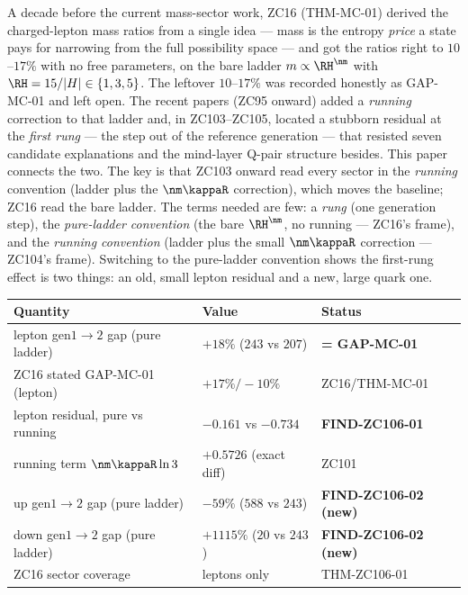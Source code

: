 \documentclass[12pt, a4paper]{article}
\begin{document}
A decade before the current mass-sector work, ZC16 (THM-MC-01) derived the
charged-lepton mass ratios from a single idea --- mass is the entropy
\emph{price} a state pays for narrowing from the full possibility space --- and
got the ratios right to $10$--$17\%$ with no free parameters, on the bare ladder
$m\propto\RH^{\nm}$ with $\RH=15/|H|\in\{1,3,5\}$. The leftover $10$--$17\%$ was
recorded honestly as GAP-MC-01 and left open. The recent papers (ZC95 onward)
added a \emph{running} correction to that ladder and, in ZC103--ZC105, located a
stubborn residual at the \emph{first rung} --- the step out of the reference
generation --- that resisted seven candidate explanations and the mind-layer
Q-pair structure besides. This paper connects the two. The key is that ZC103
onward read every sector in the \emph{running} convention (ladder plus the
$\nm\kappaR$ correction), which moves the baseline; ZC16 read the bare ladder. The
terms needed are few: a \emph{rung} (one generation step), the \emph{pure-ladder
convention} (the bare $\RH^{\nm}$, no running --- ZC16's frame), and the
\emph{running convention} (ladder plus the small $\nm\kappaR$ correction ---
ZC104's frame). Switching to the pure-ladder convention shows the first-rung
effect is two things: an old, small lepton residual and a new, large quark one.

\begin{keybox}[title={Numerical Summary --- ZC106 (T-canonical)}]
{\small\renewcommand{\arraystretch}{1.25}
\begin{center}
\begin{tabular}{@{}p{6.6cm}p{3.0cm}p{2.8cm}@{}}
\toprule
\textbf{Quantity} & \textbf{Value} & \textbf{Status} \\
\midrule
lepton gen$1{\to}2$ gap (pure ladder) & $+18\%$ ($243$ vs $207$) & \textbf{= GAP-MC-01} \\
ZC16 stated GAP-MC-01 (lepton)        & $+17\%/{-}10\%$          & ZC16/THM-MC-01 \\
lepton residual, pure vs running       & $-0.161$ vs $-0.734$     & \textbf{FIND-ZC106-01} \\
running term $\nm\kappaR\ln 3$         & $+0.5726$ (exact diff)   & ZC101 \\
up gen$1{\to}2$ gap (pure ladder)      & $-59\%$ ($588$ vs $243$) & \textbf{FIND-ZC106-02 (new)} \\
down gen$1{\to}2$ gap (pure ladder)    & $+1115\%$ ($20$ vs $243$)& \textbf{FIND-ZC106-02 (new)} \\
ZC16 sector coverage                   & leptons only            & THM-ZC106-01 \\
\bottomrule
\end{tabular}
\end{center}}
\end{keybox}
\end{document}
